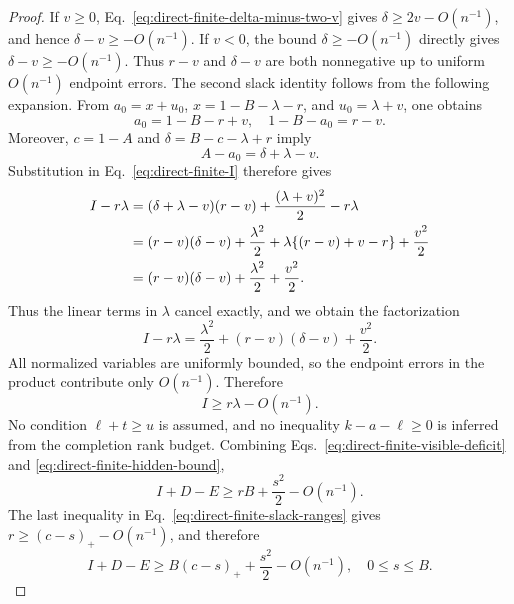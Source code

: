 \documentclass[11pt]{article}
\newcommand{\1}{\mathbf 1}
\theoremstyle{plain}
\theoremstyle{definition}
\theoremstyle{remark}
\begin{document}
\begin{proof}
If $v\ge0$, Eq.~\eqref{eq:direct-finite-delta-minus-two-v} gives
$\delta\ge2v-O(n^{-1})$, and hence $\delta-v\ge-O(n^{-1})$.  If
$v<0$, the bound $\delta\ge-O(n^{-1})$ directly gives
$\delta-v\ge-O(n^{-1})$.  Thus $r-v$ and $\delta-v$ are both
nonnegative up to uniform $O(n^{-1})$ endpoint errors.  The second slack identity follows from the following expansion.  From
$a_0=x+u_0$, $x=1-B-\lambda-r$, and $u_0=\lambda+v$, one obtains
\begin{equation}
 a_0=1-B-r+v,
 \quad 1-B-a_0=r-v.
 \label{eq:direct-finite-hidden-expansion-one}
\end{equation}
Moreover, $c=1-A$ and
$\delta=B-c-\lambda+r$ imply
\begin{equation}
 A-a_0=\delta+\lambda-v.
 \label{eq:direct-finite-hidden-expansion-two}
\end{equation}
Substitution in Eq.~\eqref{eq:direct-finite-I} therefore gives
\begin{align}
 I-r\lambda
 &=(\delta+\lambda-v)(r-v)
   +\frac{(\lambda+v)^2}{2}-r\lambda\notag\\
 &=(r-v)(\delta-v)+\frac{\lambda^2}{2}
   +\lambda\{(r-v)+v-r\}+\frac{v^2}{2}\notag\\
 &=(r-v)(\delta-v)+\frac{\lambda^2}{2}+\frac{v^2}{2}.
 \label{eq:direct-finite-hidden-expansion-three}
\end{align}
Thus the linear terms in $\lambda$ cancel exactly, and we obtain the
factorization
\begin{equation}
 I-r\lambda
 =\frac{\lambda^2}{2}
 +(r-v)(\delta-v)+\frac{v^2}{2}.
 \label{eq:direct-finite-hidden-gap}
\end{equation}
All normalized variables are uniformly bounded, so the endpoint errors in the
product contribute only $O(n^{-1})$.  Therefore
\begin{equation}
 I\ge r\lambda-O(n^{-1}).
 \label{eq:direct-finite-hidden-bound}
\end{equation}
No condition $\ell+t\ge u$ is assumed, and no inequality
$k-a-\ell\ge0$ is inferred from the completion rank budget.
Combining Eqs.~\eqref{eq:direct-finite-visible-deficit} and
\eqref{eq:direct-finite-hidden-bound},
\begin{equation}
 I+D-E
 \ge rB+\frac{s^2}{2}-O(n^{-1}).
 \label{eq:direct-finite-rs-bound}
\end{equation}
The last inequality in Eq.~\eqref{eq:direct-finite-slack-ranges} gives
$r\ge(c-s)_+-O(n^{-1})$, and therefore
\begin{equation}
 I+D-E
 \ge B(c-s)_++\frac{s^2}{2}-O(n^{-1}),
 \quad 0\le s\le B.
 \label{eq:direct-finite-one-variable}
\end{equation}


\end{proof}
\end{document}
